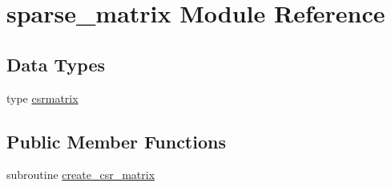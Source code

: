 \hypertarget{classsparse__matrix}{\section{sparse\-\_\-matrix Module Reference}
\label{classsparse__matrix}
}
\subsection*{Data Types}
\begin{DoxyCompactItemize}
\item 
type \hyperlink{structsparse__matrix_1_1csrmatrix}{csrmatrix}
\end{DoxyCompactItemize}
\subsection*{Public Member Functions}
\begin{DoxyCompactItemize}
\item 
subroutine \hyperlink{classsparse__matrix_ad7c261827cd94d181f79e93a6cab4fc3}{create\-\_\-csr\-\_\-matrix}
\end{DoxyCompactItemize}
